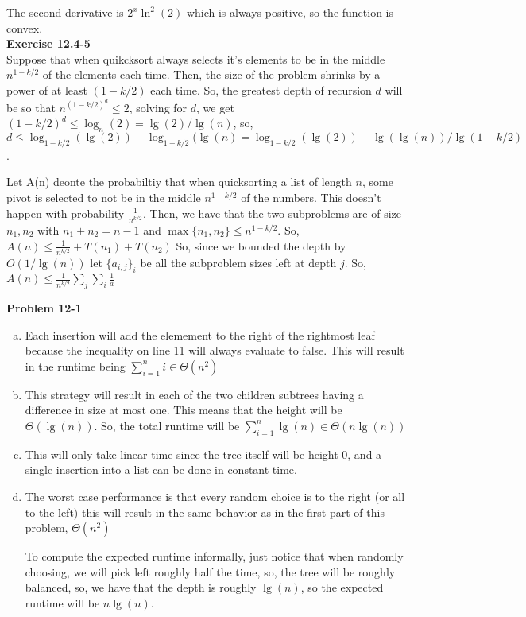 \documentclass{article}
\begin{document}
The second derivative is $2^x \ln^2(2)$ which is always positive, so the function is convex. \\

\noindent\textbf{ Exercise 12.4-5} \\

Suppose that when quikcksort always selects it's elements to be in the middle $n^{1-k/2}$ of the elements each time. Then, the size of the problem shrinks by a power of at least $(1-k/2)$ each time. So, the greatest depth of recursion $d$ will be so that $n^{(1-k/2)^d} \le2$, solving for $d$, we get $(1-k/2)^d \le \log_n(2) = \lg(2)/\lg(n)$, so, $d \le \log_{1-k/2}(\lg(2)) - \log_{1-k/2}(\lg(n) = \log_{1-k/2}(\lg(2)) - \lg(\lg(n))/ \lg(1-k/2)$.

Let A(n) deonte the probabiltiy that when quicksorting a list of length $n$, some pivot is selected to not be in  the middle $n^{1-k/2}$ of the numbers. This doesn't happen with probability $\frac{1}{n^{k/2}}$. Then, we have that the two subproblems are of size$n_1,n_2$ with $n_1+n_2 = n-1$ and $\max\{n_1,n_2\} \le n^{1-k/2}$. So, $A(n) \le \frac{1}{n^{k/2}} + T(n_1)+T(n_2)$ So, since we bounded the depth by $O(1/\lg(n))$ let $\{a_{i,j}\}_i$ be all the subproblem sizes left at depth $j$. So, $A(n) \le \frac{1}{n^{k/2}}\sum_{j} \sum_i \frac{1}{a}$

\noindent\textbf{Problem 12-1} \\

\begin{enumerate}[a.]
\item
Each insertion will add the elemement to the right of the rightmost leaf because the inequality on line 11 will always evaluate to false. This will result in the runtime being $\sum_{i=1}^n i \in \Theta(n^2)$

\item
This strategy will result in each of the two children subtrees having a difference in size at most one. This means that the height will be $\Theta(\lg(n))$. So, the total runtime will be $\sum_{i=1}^n \lg(n) \in \Theta(n\lg(n))$

\item
This will only take linear time since the tree itself will be height 0, and a single insertion into a list can be done in constant time.

\item
The worst case performance is that every random choice is to the right (or all to the left) this will result in the same behavior as in the first part of this problem, $\Theta(n^2)$

To compute the expected runtime informally, just notice that when randomly choosing, we will pick left roughly half the time, so, the tree will be roughly balanced, so, we have that the depth is roughly $\lg(n)$, so the expected runtime will be $n\lg(n)$.


\end{enumerate}
\end{document}
